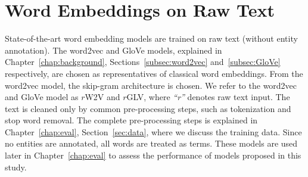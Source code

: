 \section{Word Embeddings on Raw Text}\label{sec:raw}
State-of-the-art word embedding models are trained on raw text (without entity annotation). The word2vec and GloVe models, explained in Chapter~\ref{chap:background}, Sections~\ref{subsec:word2vec} and~\ref{subsec:GloVe} respectively, are chosen as representatives of classical word embeddings. From the word2vec model, the skip-gram architecture is chosen. We refer to the word2vec and GloVe model as $r$W2V and  $r$GLV, where \emph{``r''} denotes raw text input. The text is cleaned only by common pre-processing steps, such as tokenization and stop word removal. The complete pre-processing steps is explained in Chapter~\ref{chap:eval}, Section~\ref{sec:data}, where we discuss the training data. 
Since no entities are annotated, all words are treated as terms. These models are used later in Chapter~\ref{chap:eval} to assess the performance of models proposed in this study. 

